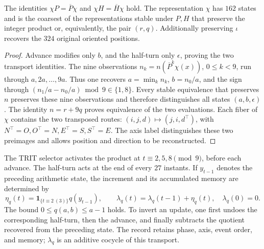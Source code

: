 \begin{proposition}
\label{ii:prd-arit:minimal}
The identities \(\chi P=\overline P\chi\) and
\(\chi H=\overline H\chi\) hold. The representation \(\chi\)
has \(162\) states and is the coarsest of the representations
stable under \(P,H\) that preserve the integer product or,
equivalently, the pair \((r,q)\). Additionally preserving \(\iota\)
recovers the \(324\) original oriented positions.
\end{proposition}
\begin{proof}
Advance modifies only \(b\), and the half-turn only
\(\epsilon\), proving the two transport identities.
The nine observations \(n_k=n(\overline P^k\chi(x))\),
\(0\leq k<9\), run through \(a,2a,\ldots,9a\). Thus one recovers
\(a=\min_k n_k\), \(b=n_0/a\), and the sign through
\((n_1/a-n_0/a)\bmod9\in\{1,8\}\). Every stable equivalence
that preserves \(n\) preserves these nine observations and therefore
distinguishes all states \((a,b,\epsilon)\).
The identity \(n=r+9q\) proves equivalence of the two
evaluations. Each fiber of \(\chi\) contains the two transposed
routes: \((i,j,d)\mapsto(j,i,d^\top)\), with
\(N^\top=O,O^\top=N,E^\top=S,S^\top=E\). The axis label distinguishes
these two preimages and allows position and direction to be reconstructed.
\end{proof}

The TRIT selector activates the product at \(t\equiv2,5,8\pmod9\),
before each advance. The half-turn acts at the end of every
\(27\) instants. If \(y_{t-1}\) denotes the preceding arithmetic
state, the increment and its accumulated memory are determined by
\begin{equation}
 \eta_q(t)=\mathbf1_{\{t\equiv2\ (3)\}}q(y_{t-1}),\qquad
 \lambda_q(t)=\lambda_q(t-1)+\eta_q(t),\quad \lambda_q(0)=0.
 \label{ii:prd-arit:incremento}
\end{equation}
The bound \(0\leq q(a,b)\leq a-1\) holds. To invert an
update, one first undoes the corresponding half-turn,
then the advance, and finally subtracts the quotient recovered from the
preceding state. The record retains phase, axis, event order, and
memory; \(\lambda_q\) is an additive cocycle of this transport.

